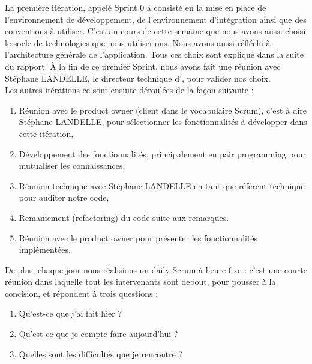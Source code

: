 La première itération, appelé Sprint 0 a consisté en la mise en place de l'environnement de développement, de l'environnement d'intégration ainsi que des conventions à utiliser. C'est au cours de cette semaine que nous avons aussi choisi le socle de technologies que nous utiliserions. Nous avons aussi réfléchi à l'architecture générale de l'application. Tous ces choix sont expliqué dans la suite du rapport. À la fin de ce premier Sprint, nous avons fait une réunion avec Stéphane LANDELLE, le directeur technique d'\ebi{}, pour valider nos choix.\\

Les autres itérations ce sont ensuite déroulées de la façon suivante :
\begin{enumerate}
	\item Réunion avec le \flqq{}product owner\frqq{} (client dans le vocabulaire Scrum), c'est à dire Stéphane LANDELLE, pour sélectionner les fonctionnalités à développer dans cette itération,
	
	\item Développement des fonctionnalités, principalement en pair programming pour mutualiser les connaissances,
	
	\item Réunion technique avec Stéphane LANDELLE en tant que référent technique pour auditer notre code,
	
	\item Remaniement (refactoring) du code suite aux remarques.
	
	\item Réunion avec le \flqq{}product owner\frqq{} pour présenter les fonctionnalités implémentées.\\
\end{enumerate}

De plus, chaque jour nous réalisions un \flqq{}daily Scrum\frqq{} à heure fixe : c'est une courte réunion dans laquelle tout les intervenants sont debout, pour pousser à la concision, et répondent à trois questions :
\begin{enumerate}
	\item Qu'est-ce que j'ai fait hier ?
	
	\item Qu'est-ce que je compte faire aujourd'hui ?
	
	\item Quelles sont les difficultés que je rencontre ?\\
\end{enumerate}

